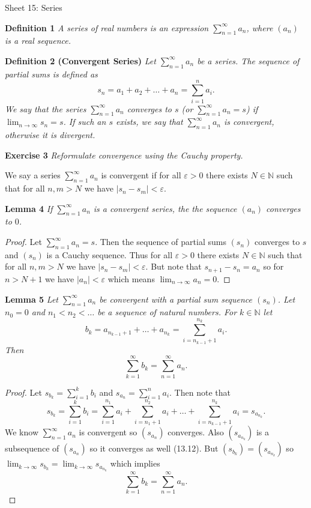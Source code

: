 \documentclass{article}
\begin{document}
\begin{flushleft}

\Large

Sheet 15: Series\newline

\normalsize

\textbf{Definition 1}
\textsl{A series of real numbers is an expression $\sum_{n=1}^{\infty} a_n$, where $(a_n)$ is a real sequence.}\newline

\textbf{Definition 2 (Convergent Series)}
\textsl{Let $\sum_{n=1}^{\infty} a_n$ be a series. The sequence of partial sums is defined as
\[
s_n = a_1 + a_2 + \dots + a_n = \sum_{i=1}^{n} a_i.
\]
We say that the series $\sum_{n=1}^{\infty} a_n$ converges to $s$ (or $\sum_{n=1}^{\infty} a_n = s$) if $\lim_{n \rightarrow \infty} s_n = s$. If such an $s$ exists, we say that $\sum_{n=1}^{\infty} a_n$ is convergent, otherwise it is divergent.}\newline

\textbf{Exercise 3}
\textsl{Reformulate convergence using the Cauchy property.}\newline

We say a series $\sum_{n=1}^{\infty} a_n$ is convergent if for all $\varepsilon > 0$ there exists $N \in \mathbb{N}$ such that for all $n, m > N$ we have $|s_n - s_m| < \varepsilon$.\newline

\textbf{Lemma 4}
\textsl{If $\sum_{n=1}^{\infty} a_n$ is a convergent series, the the sequence $(a_n)$ converges to $0$.}
\begin{proof}
Let $\sum_{n=1}^{\infty} a_n = s$. Then the sequence of partial sums $(s_n)$ converges to $s$ and $(s_n)$ is a Cauchy sequence. Thus for all $\varepsilon > 0$ there exists $N \in \mathbb{N}$ such that for all $n,m > N$ we have $|s_n - s_m| < \varepsilon$. But note that $s_{n+1} - s_n= a_n$ so for $n > N+1$ we have $|a_n| < \varepsilon$ which means $\lim_{n \rightarrow \infty} a_n = 0$.
\end{proof}

\textbf{Lemma 5}
\textsl{Let $\sum_{n=1}^{\infty} a_n$ be convergent with a partial sum sequence $(s_n)$. Let $n_0 = 0$ and $n_1 < n_2 < \dots$ be a sequence of natural numbers. For $k \in \mathbb{N}$ let
\[
b_k = a_{n_{k-1}+1} + \dots + a_{n_k} = \sum_{i = n_{k-1} + 1}^{n_k} a_i.
\]
Then
\[
\sum_{k=1}^{\infty} b_k = \sum_{n=1}^{\infty} a_n.
\]}
\begin{proof}
Let $s_{b_k} = \sum_{i=1}^{k} b_i$ and $s_{a_n} = \sum_{i=1}^{n} a_i$. Then note that
\[
s_{b_k} = \sum_{i=1}^{k} b_i = \sum_{i=1}^{n_1} a_i + \sum_{i = n_{1} + 1}^{n_2} a_i + \dots + \sum_{i = n_{k-1} + 1}^{n_k} a_i = s_{a_{n_k}}.
\]
We know $\sum_{n=1}^{\infty} a_n$ is convergent so $(s_{a_n})$ converges. Also $(s_{a_{n_k}})$ is a subsequence of $(s_{a_n})$ so it converges as well (13.12). But $(s_{b_k}) = (s_{a_{n_k}})$ so $\lim_{k \rightarrow \infty} s_{b_k} = \lim_{k \rightarrow \infty} s_{a_{n_k}}$ which implies
\[
\sum_{k=1}^{\infty} b_k = \sum_{n=1}^{\infty} a_n.
\]
\end{proof}


\end{flushleft}
\end{document}
